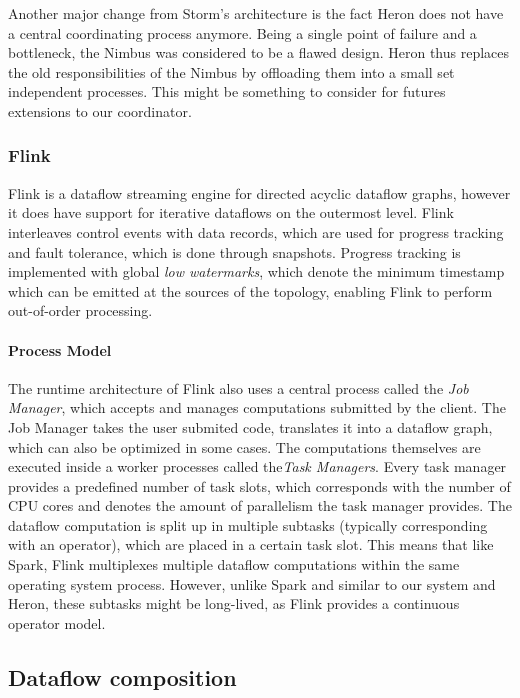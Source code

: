 Another major change from Storm's architecture
is the fact Heron does not have a central coordinating process anymore. Being
a single point of failure and a bottleneck, the Nimbus was considered to be a
flawed design. Heron thus replaces the old responsibilities of the Nimbus by
offloading them into a small set independent processes. This might be something
to consider for futures extensions to our coordinator.

\subsubsection{Flink}

Flink \cite{flink} is a dataflow streaming engine for directed acyclic
dataflow graphs, however it does have support for iterative dataflows on the
outermost level. Flink interleaves control events with data records, which
are used for progress tracking and fault tolerance, which is done through
snapshots. Progress tracking is implemented with global \emph{low watermarks}, which
denote the minimum timestamp which can be emitted at the sources of the
topology, enabling Flink to perform out-of-order processing.

\paragraph{Process Model}

The runtime architecture of Flink also uses a central process called the
\emph{Job Manager}, which accepts and manages computations submitted by
the client. The Job Manager takes the user submited code, translates it into
a dataflow graph, which can also be optimized in some cases.
The computations themselves are executed inside a worker processes called
the\emph{Task Managers}. Every task manager provides a predefined number of
task slots, which corresponds with the number of CPU cores and denotes the
amount of parallelism the task manager provides. The dataflow computation is
split up in multiple subtasks (typically corresponding with an operator), which
are placed in a certain task slot. This means that like Spark, Flink multiplexes
multiple dataflow computations within the same operating system process.
However, unlike Spark and similar to our system and Heron, these subtasks might
be long-lived, as Flink provides a continuous operator model.

\subsection{Dataflow composition}

